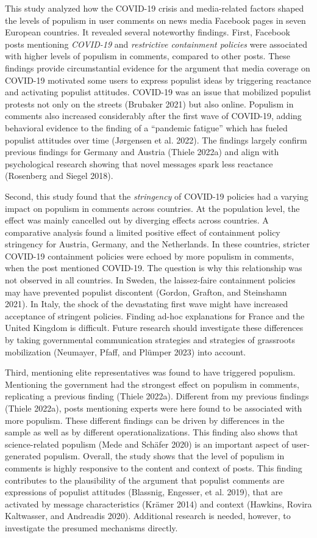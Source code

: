 \documentclass[
]{ccr}
\begin{document}
This study analyzed how the COVID-19 crisis and media-related factors
shaped the levels of populism in user comments on news media Facebook
pages in seven European countries. It revealed several noteworthy
findings. First, Facebook posts mentioning \emph{COVID-19} and
\emph{restrictive containment policies} were associated with higher
levels of populism in comments, compared to other posts. These findings
provide circumstantial evidence for the argument that media coverage on
COVID-19 motivated some users to express populist ideas by triggering
reactance and activating populist attitudes. COVID-19 was an issue that
mobilized populist protests not only on the streets (Brubaker 2021) but
also online. Populism in comments also increased considerably after the
first wave of COVID-19, adding behavioral evidence to the finding of a
``pandemic fatigue'' which has fueled populist attitudes over time
(Jørgensen et al. 2022). The findings largely confirm previous findings
for Germany and Austria (Thiele 2022a) and align with psychological
research showing that novel messages spark less reactance (Rosenberg and
Siegel 2018).

Second, this study found that the \emph{stringency} of COVID-19 policies
had a varying impact on populism in comments across countries. At the
population level, the effect was mainly cancelled out by diverging
effects across countries. A comparative analysis found a limited
positive effect of containment policy stringency for Austria, Germany,
and the Netherlands. In these countries, stricter COVID-19 containment
policies were echoed by more populism in comments, when the post
mentioned COVID-19. The question is why this relationship was not
observed in all countries. In Sweden, the laissez-faire containment
policies may have prevented populist discontent (Gordon, Grafton, and
Steinshamn 2021). In Italy, the shock of the devastating first wave
might have increased acceptance of stringent policies. Finding ad-hoc
explanations for France and the United Kingdom is difficult. Future
research should investigate these differences by taking governmental
communication strategies and strategies of grassroots mobilization
(Neumayer, Pfaff, and Plümper 2023) into account.

Third, mentioning elite representatives was found to have triggered
populism. Mentioning the government had the strongest effect on populism
in comments, replicating a previous finding (Thiele 2022a). Different
from my previous findings (Thiele 2022a), posts mentioning experts were
here found to be associated with more populism. These different findings
can be driven by differences in the sample as well as by different
operationalizations. This finding also shows that science-related
populism (Mede and Schäfer 2020) is an important aspect of
user-generated populism. Overall, the study shows that the level of
populism in comments is highly responsive to the content and context of
posts. This finding contributes to the plausibility of the argument that
populist comments are expressions of populist attitudes (Blassnig,
Engesser, et al. 2019), that are activated by message characteristics
(Krämer 2014) and context (Hawkins, Rovira Kaltwasser, and Andreadis
2020). Additional research is needed, however, to investigate the
presumed mechanisms directly.
\end{document}
